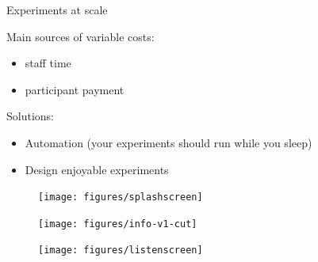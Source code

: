 \documentclass[aspectratio=169]{beamer}
\begin{document}
\begin{frame}

{\Large
\begin{center}
Experiments at scale
\end{center}
}
\end{frame}
\begin{frame}

\begin{center}
\end{center}

\end{frame}
\begin{frame}

Main sources of variable costs:
\begin{itemize}
\item staff time
\item participant payment
\end{itemize}

\vfill
\pause
Solutions:
\begin{itemize}
\item Automation (your experiments should run while you sleep)
\item Design enjoyable experiments
\end{itemize}

\end{frame}
\begin{frame}

\begin{figure}
  \centering
  \texttt{[image: figures/splashscreen]}
\end{figure}

\end{frame}
\begin{frame}

\begin{figure}
  \centering
  \texttt{[image: figures/info-v1-cut]}
\end{figure}

\end{frame}
\begin{frame} 

\begin{figure}
  \centering
  \texttt{[image: figures/listenscreen]}
\end{figure}

\end{frame}
\end{document}
